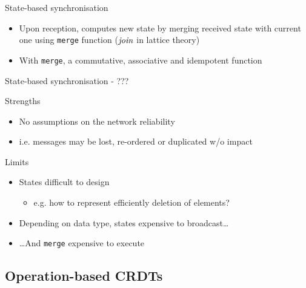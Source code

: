 \begin{frame}{State-based synchronisation}
    \begin{itemize}
        \item Upon reception, \alert{computes new state by merging received state with current one} using \texttt{merge} function  ($\mathit{join}$ in lattice theory)
        \item With \texttt{merge}, a \alert{commutative, associative and idempotent function}
    \end{itemize}
\end{frame}

\begin{frame}{State-based synchronisation - ???}

    \begin{block}{Strengths}
        \begin{itemize}
            \item No assumptions on the network reliability
            \item i.e. messages may be lost, re-ordered or duplicated w/o impact
        \end{itemize}
    \end{block}
    \pause
    \begin{block}{Limits}
        \begin{itemize}
            \item States difficult to design
            \begin{itemize}
                \item e.g. how to represent efficiently deletion of elements?
            \end{itemize}
            \pause
            \item Depending on data type, states expensive to broadcast\dots
            \item \dots And \texttt{merge} expensive to execute
        \end{itemize}
    \end{block}
\end{frame}

\subsection{Operation-based CRDTs}

